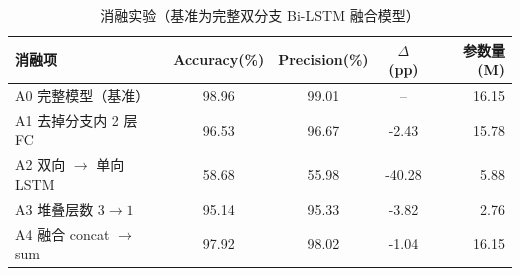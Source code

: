 \begin{table}[htbp]\centering
\caption{消融实验（基准为完整双分支 Bi-LSTM 融合模型）}
\label{tab:ablation}
\begin{tabular}{lcccr}
\toprule
消融项 & Accuracy(\%) & Precision(\%) & $\Delta$(pp) & 参数量(M) \\
\midrule
A0 完整模型（基准） & 98.96 & 99.01 & -- & 16.15 \\
A1 去掉分支内 2 层 FC & 96.53 & 96.67 & -2.43 & 15.78 \\
A2 双向 $\rightarrow$ 单向 LSTM & 58.68 & 55.98 & -40.28 & 5.88 \\
A3 堆叠层数 $3\rightarrow1$ & 95.14 & 95.33 & -3.82 & 2.76 \\
A4 融合 concat $\rightarrow$ sum & 97.92 & 98.02 & -1.04 & 16.15 \\
\bottomrule
\end{tabular}
\end{table}
